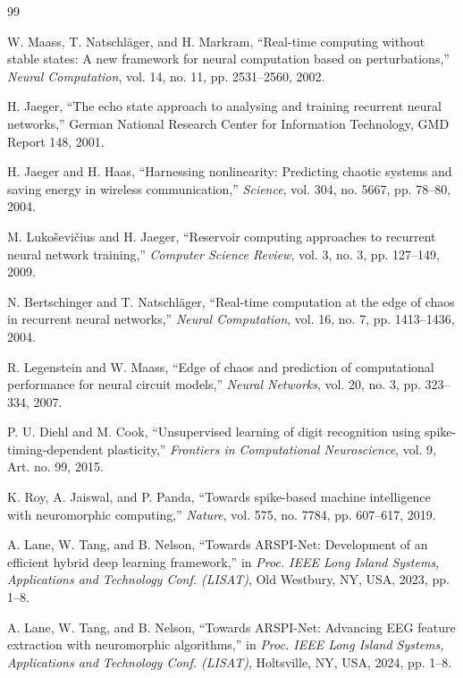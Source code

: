 \documentclass[conference]{IEEEtran}
\begin{document}
\begin{thebibliography}{99}

W. Maass, T. Natschl\"ager, and H. Markram, ``Real-time computing without stable states: A new framework for neural computation based on perturbations,'' \emph{Neural Computation}, vol. 14, no. 11, pp. 2531--2560, 2002.

H. Jaeger, ``The echo state approach to analysing and training recurrent neural networks,'' German National Research Center for Information Technology, GMD Report 148, 2001.

H. Jaeger and H. Haas, ``Harnessing nonlinearity: Predicting chaotic systems and saving energy in wireless communication,'' \emph{Science}, vol. 304, no. 5667, pp. 78--80, 2004.

M. Luko\v{s}evi\v{c}ius and H. Jaeger, ``Reservoir computing approaches to recurrent neural network training,'' \emph{Computer Science Review}, vol. 3, no. 3, pp. 127--149, 2009.

N. Bertschinger and T. Natschl\"ager, ``Real-time computation at the edge of chaos in recurrent neural networks,'' \emph{Neural Computation}, vol. 16, no. 7, pp. 1413--1436, 2004.

R. Legenstein and W. Maass, ``Edge of chaos and prediction of computational performance for neural circuit models,'' \emph{Neural Networks}, vol. 20, no. 3, pp. 323--334, 2007.

P. U. Diehl and M. Cook, ``Unsupervised learning of digit recognition using spike-timing-dependent plasticity,'' \emph{Frontiers in Computational Neuroscience}, vol. 9, Art. no. 99, 2015.

K. Roy, A. Jaiswal, and P. Panda, ``Towards spike-based machine intelligence with neuromorphic computing,'' \emph{Nature}, vol. 575, no. 7784, pp. 607--617, 2019.

A. Lane, W. Tang, and B. Nelson, ``Towards ARSPI-Net: Development of an efficient hybrid deep learning framework,'' in \emph{Proc. IEEE Long Island Systems, Applications and Technology Conf. (LISAT)}, Old Westbury, NY, USA, 2023, pp. 1--8.

A. Lane, W. Tang, and B. Nelson, ``Towards ARSPI-Net: Advancing EEG feature extraction with neuromorphic algorithms,'' in \emph{Proc. IEEE Long Island Systems, Applications and Technology Conf. (LISAT)}, Holtsville, NY, USA, 2024, pp. 1--8.


\end{thebibliography}
\end{document}
